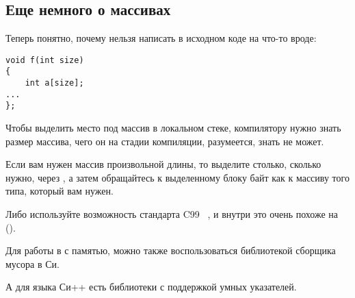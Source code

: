 \subsection{Еще немного о массивах}

Теперь понятно, почему нельзя написать в исходном коде на \CCpp что-то вроде:


\begin{lstlisting}[style=customc]
void f(int size)
{
    int a[size];
...
};
\end{lstlisting}

Чтобы выделить место под массив в локальном стеке, 
компилятору нужно знать размер массива, чего он на стадии компиляции, 
разумеется, знать не может.


Если вам нужен массив произвольной длины, то выделите столько, сколько нужно, через , 
а затем обращайтесь к выделенному блоку байт как к массиву того типа, который вам нужен.


Либо используйте возможность стандарта C99~ ,
и внутри это очень похоже на  ().


Для работы в с памятью, можно также воспользоваться библиотекой сборщика мусора в Си.

А для языка Си++ есть библиотеки с поддержкой умных указателей.


